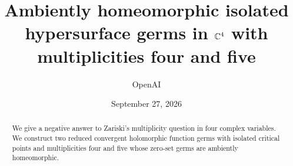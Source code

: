 \documentclass[11pt]{article}
\title{Ambiently homeomorphic isolated hypersurface germs in \texorpdfstring{\(\mathbb C^4\)}{C4} with multiplicities four and five}
\author{OpenAI}
\date{September 27, 2026}
\begin{document}
\maketitle
\begin{abstract}
We give a negative answer to Zariski's multiplicity question in four
complex variables. We construct two reduced convergent holomorphic
function germs with isolated critical points and multiplicities four and
five whose zero-set germs are ambiently homeomorphic.
\end{abstract}











\end{document}
